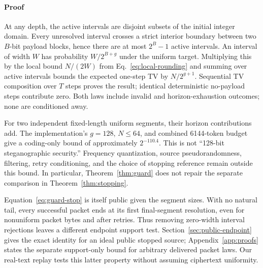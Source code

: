 \paragraph{Proof}
At any depth, the active intervals are disjoint subsets of the initial integer
domain. Every unresolved interval crosses a strict interior boundary between
two $B$-bit payload blocks, hence there are at most $2^B-1$ active intervals.
An interval of width $W$ has probability $W/2^{B+g}$ under the uniform target.
Multiplying this by the local bound $N/(2W)$ from
Eq.~\eqref{eq:local-rounding} and summing over active intervals bounds the
expected one-step TV by $N/2^{g+1}$. Sequential TV composition over $T$ steps
proves the result; identical deterministic no-payload steps contribute zero.
Both laws include invalid and horizon-exhaustion outcomes;
none are conditioned away.

For two independent fixed-length uniform segments, their horizon contributions
add. The implementation's $g=128$, $N\le64$, and combined 6144-token budget give
a coding-only bound of approximately $2^{-110.4}$. This is not ``128-bit
steganographic security.'' Frequency quantization, source pseudorandomness,
filtering, retry conditioning, and the choice of stopping reference remain
outside this bound. In particular, Theorem~\ref{thm:guard} does not repair the
separate comparison in Theorem~\ref{thm:stopping}.

Equation~\eqref{eq:guard-stop} is itself public given the segment sizes. With no
natural tail, every successful packet ends at its first final-segment
resolution, even for nonuniform packet bytes and after retries. Thus removing
zero-width interval rejections leaves a different endpoint support test.
Section~\ref{sec:public-endpoint} gives the exact identity for an ideal public
stopped source; Appendix~\ref{app:proofs} states the separate support-only bound
for arbitrary delivered packet laws. Our real-text replay tests this latter
property without assuming ciphertext uniformity.
